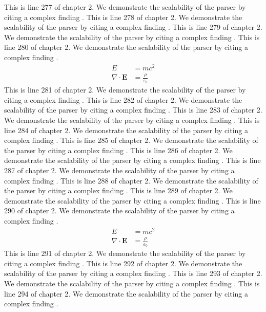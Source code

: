 This is line 277 of chapter 2. We demonstrate the scalability of the parser by citing a complex finding \cite{ref2_277}.
This is line 278 of chapter 2. We demonstrate the scalability of the parser by citing a complex finding \cite{ref2_278}.
This is line 279 of chapter 2. We demonstrate the scalability of the parser by citing a complex finding \cite{ref2_279}.
This is line 280 of chapter 2. We demonstrate the scalability of the parser by citing a complex finding \cite{ref2_280}.
\begin{align*}
  E &= mc^2 \\
  \nabla \cdot \mathbf{E} &= \frac{\rho}{\varepsilon_0}
\end{align*}
This is line 281 of chapter 2. We demonstrate the scalability of the parser by citing a complex finding \cite{ref2_281}.
This is line 282 of chapter 2. We demonstrate the scalability of the parser by citing a complex finding \cite{ref2_282}.
This is line 283 of chapter 2. We demonstrate the scalability of the parser by citing a complex finding \cite{ref2_283}.
This is line 284 of chapter 2. We demonstrate the scalability of the parser by citing a complex finding \cite{ref2_284}.
This is line 285 of chapter 2. We demonstrate the scalability of the parser by citing a complex finding \cite{ref2_285}.
This is line 286 of chapter 2. We demonstrate the scalability of the parser by citing a complex finding \cite{ref2_286}.
This is line 287 of chapter 2. We demonstrate the scalability of the parser by citing a complex finding \cite{ref2_287}.
This is line 288 of chapter 2. We demonstrate the scalability of the parser by citing a complex finding \cite{ref2_288}.
This is line 289 of chapter 2. We demonstrate the scalability of the parser by citing a complex finding \cite{ref2_289}.
This is line 290 of chapter 2. We demonstrate the scalability of the parser by citing a complex finding \cite{ref2_290}.
\begin{align*}
  E &= mc^2 \\
  \nabla \cdot \mathbf{E} &= \frac{\rho}{\varepsilon_0}
\end{align*}
This is line 291 of chapter 2. We demonstrate the scalability of the parser by citing a complex finding \cite{ref2_291}.
This is line 292 of chapter 2. We demonstrate the scalability of the parser by citing a complex finding \cite{ref2_292}.
This is line 293 of chapter 2. We demonstrate the scalability of the parser by citing a complex finding \cite{ref2_293}.
This is line 294 of chapter 2. We demonstrate the scalability of the parser by citing a complex finding \cite{ref2_294}.
